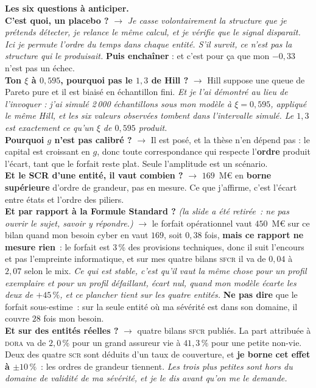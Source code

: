 \documentclass[9pt,a4paper]{article}
\begin{document}
\vspace{-2pt}
\begin{alerte}
\footnotesize
\textbf{Les six questions à anticiper.}\\[3pt]
\textbf{\og C'est quoi, un placebo ?\fg} $\rightarrow$ \emph{Je casse volontairement la
structure que je prétends détecter, je relance le même calcul, et je vérifie que le signal
disparaît. Ici je permute l'ordre du temps dans chaque entité. S'il survit, ce n'est pas la
structure qui le produisait.} \textbf{Puis enchaîner} : et c'est pour ça que mon $-0{,}33$
n'est pas un échec.\\[3pt]
\textbf{\og Ton $\xi$ à $0{,}595$, pourquoi pas le $1{,}3$ de Hill ?\fg} $\rightarrow$ Hill
suppose une queue de Pareto pure et il est biaisé en échantillon fini. \emph{Et je l'ai
démontré au lieu de l'invoquer : j'ai simulé 2\,000 échantillons sous mon modèle à
$\xi=0{,}595$, appliqué le même Hill, et les six valeurs observées tombent dans l'intervalle
simulé. Le $1{,}3$ est exactement ce qu'un $\xi$ de $0{,}595$ produit.}\\[3pt]
\textbf{\og Pourquoi $g$ n'est pas calibré ?\fg} $\rightarrow$ Il est posé, et la thèse n'en
dépend pas : le capital est croissant en $g$, donc toute correspondance qui respecte
l'\textbf{ordre} produit l'écart, tant que le forfait reste plat. Seule l'amplitude est un
scénario.\\[3pt]
\textbf{\og Et le SCR d'une entité, il vaut combien ?\fg} $\rightarrow$ $169$~M\euro{} en
\textbf{borne supérieure} d'ordre de grandeur, pas en mesure. Ce que j'affirme, c'est l'écart
entre états et l'ordre des piliers.\\[3pt]
\textbf{\og Et par rapport à la Formule Standard ?\fg} \emph{(la slide a été retirée~: ne pas
ouvrir le sujet, savoir y répondre.)} $\rightarrow$ le forfait opérationnel vaut $450$~M\euro{}
sur ce bilan quand mon besoin cyber en vaut $169$, soit $0{,}38$ fois, \textbf{mais ce rapport
ne mesure rien}~: le forfait est 3\,\% des provisions techniques, donc il suit l'encours et pas
l'empreinte informatique, et sur mes quatre bilans \textsc{sfcr} il va de $0{,}04$ à $2{,}07$
selon le mix. \emph{Ce qui est stable, c'est qu'il vaut la même chose pour un profil exemplaire
et pour un profil défaillant, écart nul, quand mon modèle écarte les deux de $+45\,\%$, et ce
plancher tient sur les quatre entités.} \textbf{Ne pas dire} que le forfait sous-estime~: sur la
seule entité où ma sévérité est dans son domaine, il couvre $28$ fois mon besoin.\\[3pt]
\textbf{\og Et sur des entités réelles ?\fg} $\rightarrow$ quatre bilans \textsc{sfcr} publiés.
La part attribuée à \textsc{dora} va de $2{,}0\,\%$ pour un grand assureur vie à $41{,}3\,\%$
pour une petite non-vie. Deux des quatre \textsc{scr} sont déduits d'un taux de couverture, et
\textbf{je borne cet effet à $\pm10\,\%$}~: les ordres de grandeur tiennent. \emph{Les trois
plus petites sont hors du domaine de validité de ma sévérité, et je le dis avant qu'on me le
demande.}
\end{alerte}
\end{document}

